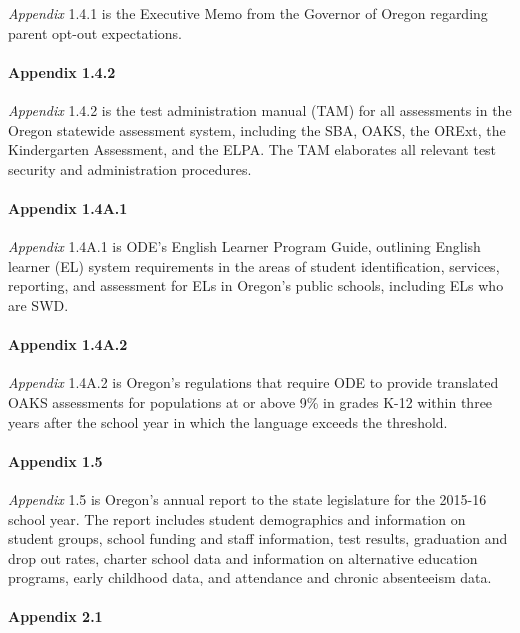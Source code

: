 \documentclass[]{article}
\let\oldparagraph\paragraph
\renewcommand{\paragraph}[1]{\oldparagraph{#1}\mbox{}}
\begin{document}
\emph{Appendix} 1.4.1 is the Executive Memo from the Governor of Oregon
regarding parent opt-out expectations.

\paragraph{Appendix 1.4.2}\label{appendix-1.4.2}

\emph{Appendix} 1.4.2 is the test administration manual (TAM) for all
assessments in the Oregon statewide assessment system, including the
SBA, OAKS, the ORExt, the Kindergarten Assessment, and the ELPA. The TAM
elaborates all relevant test security and administration procedures.

\paragraph{Appendix 1.4A.1}\label{appendix-1.4a.1}

\emph{Appendix} 1.4A.1 is ODE's English Learner Program Guide, outlining
English learner (EL) system requirements in the areas of student
identification, services, reporting, and assessment for ELs in Oregon's
public schools, including ELs who are SWD.

\paragraph{Appendix 1.4A.2}\label{appendix-1.4a.2}

\emph{Appendix} 1.4A.2 is Oregon's regulations that require ODE to
provide translated OAKS assessments for populations at or above 9\% in
grades K-12 within three years after the school year in which the
language exceeds the threshold.

\paragraph{Appendix 1.5}\label{appendix-1.5}

\emph{Appendix} 1.5 is Oregon's annual report to the state legislature
for the 2015-16 school year. The report includes student demographics
and information on student groups, school funding and staff information,
test results, graduation and drop out rates, charter school data and
information on alternative education programs, early childhood data, and
attendance and chronic absenteeism data.

\paragraph{Appendix 2.1}\label{appendix-2.1}
\end{document}

